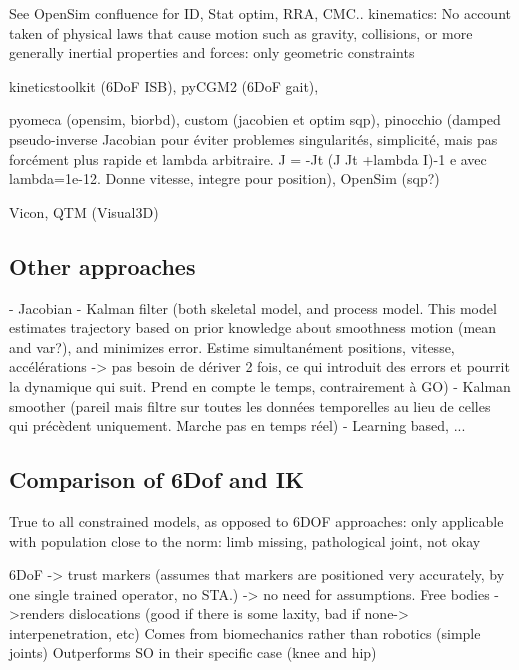 See OpenSim confluence for ID, Stat optim, RRA, CMC..
kinematics: No account taken of physical laws that cause motion such as gravity, collisions, or more generally inertial properties and forces: only geometric constraints








kineticstoolkit (6DoF ISB), pyCGM2 (6DoF gait), 

pyomeca (opensim, biorbd), custom (jacobien et optim sqp), pinocchio (damped pseudo-inverse Jacobian pour éviter problemes singularités, simplicité, mais pas forcément plus rapide et lambda arbitraire. J = -Jt (J Jt +lambda I)-1 e avec lambda=1e-12. Donne vitesse, integre pour position), OpenSim (sqp?)

Vicon, QTM (Visual3D)






\subsection{Other approaches}

\cite{DeGroote2008,Aristidou2017}
- Jacobian
- Kalman filter (both skeletal model, and process model. This model estimates trajectory based on prior knowledge about smoothness motion (mean and var?), and minimizes error. Estime simultanément positions, vitesse, accélérations -> pas besoin de dériver 2 fois, ce qui introduit des errors et pourrit la dynamique qui suit. Prend en compte le temps, contrairement à GO)
- Kalman smoother (pareil mais filtre sur toutes les données temporelles au lieu de celles qui précèdent uniquement. Marche pas en temps réel)
- Learning based, ...


 

\subsection{Comparison of 6Dof and IK}

True to all constrained models, as opposed to 6DOF approaches: only applicable with population close to the norm: limb missing, pathological joint, not okay

6DoF
-> trust markers (assumes that markers are positioned very accurately, by one single trained operator, no STA.)
-> no need for assumptions. Free bodies
->renders dislocations (good if there is some laxity, bad if none-> interpenetration, etc) Comes from biomechanics rather than robotics (simple joints)
Outperforms SO in their specific case (knee and hip) \cite{Lu1999}



